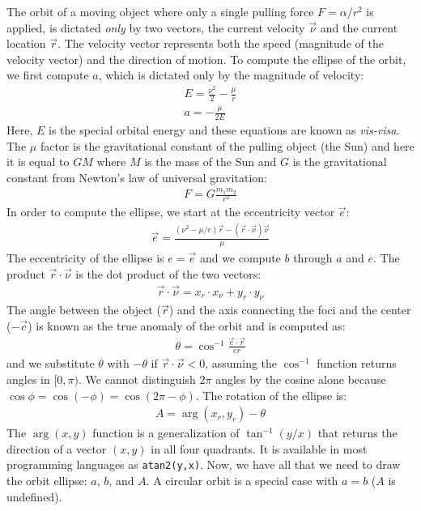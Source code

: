 \begin{appendices}
The orbit of a moving object where only a single pulling force $F = \alpha/r^2$ is applied, is dictated \emph{only} by two vectors, the current velocity $\vec{\nu}$ and the current location $\vec{r}$. The velocity vector represents both the speed (magnitude of the velocity vector) and the direction of motion. To compute the ellipse of the orbit, we first compute $a$, which is dictated only by the magnitude of velocity:
\begin{eqnarray*}
E = \frac{\nu^2}{2}-\frac{\mu}{r}\\
a = -\frac{\mu}{2E}
\end{eqnarray*}
Here, $E$ is the special orbital energy and these equations are known as \emph{vis-visa}. The $\mu$ factor is the gravitational constant of the pulling object (the Sun) and here it is equal to $GM$ where $M$ is the mass of the Sun and $G$ is the gravitational constant from Newton's law of universal gravitation:
\begin{eqnarray*}
F = G\frac{m_1 m_2}{r^2}
\end{eqnarray*}
In order to compute the ellipse, we start at the eccentricity vector $\vec{e}$:
\begin{eqnarray*}
\vec{e} = \frac{(\nu^2 - \mu/r)\vec{r} - (\vec{r} \cdot \vec{\nu})\vec{\nu}}{\mu}
\end{eqnarray*}
The eccentricity of the ellipse is $e = \vec{e}$ and we compute $b$ through $a$ and $e$. The product $\vec{r} \cdot \vec{\nu}$ is the dot product of the two vectors:
\begin{eqnarray*}
\vec{r} \cdot \vec{\nu} = x_r \cdot x_{\nu} + y_r \cdot y_{\nu}
\end{eqnarray*}
The angle between the object ($\vec{r}$) and the axis connecting the foci and the center ($-\vec{c}$) is known as the true anomaly of the orbit and is computed as:
\begin{eqnarray*}
\theta = \cos^{-1}\frac{\vec{e} \cdot \vec{r}}{er}
\end{eqnarray*}
and we substitute $\theta$ with $-\theta$ if $\vec{r} \cdot \vec{\nu} < 0$, assuming the $\cos^{-1}$ function returns angles in $[0,\pi)$. We cannot distinguish $2\pi$ angles by the cosine alone because $\cos{\phi} = \cos{(-\phi)}
= \cos{(2\pi-\phi)}$. The rotation of the ellipse is:
\begin{eqnarray*}
A = \arg(x_r,y_r) - \theta
\end{eqnarray*}
The $\arg(x,y)$ function is a generalization of $\tan^{-1}(y/x)$ that returns the direction of a vector $(x,y)$ in all four quadrants. It is available in most programming languages as \verb#atan2(y,x)#. Now, we have all that we need to draw the orbit ellipse: $a$, $b$, and $A$. A circular orbit is a special case with $a = b$ ($A$ is undefined).


\end{appendices}
